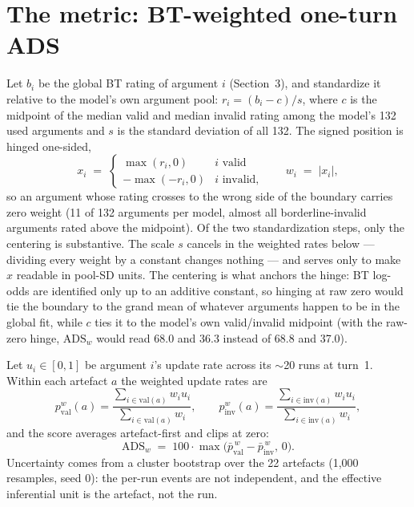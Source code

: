 \documentclass[11pt]{article}
\begin{document}
\section{The metric: BT-weighted one-turn ADS}

Let $b_i$ be the global BT rating of argument $i$ (Section~3), and standardize it relative to the model's own argument pool: $r_i = (b_i - c)/s$, where $c$ is the midpoint of the median valid and median invalid rating among the model's 132 used arguments and $s$ is the standard deviation of all 132. The signed position is hinged one-sided,
\[
x_i \;=\; \begin{cases} \max(r_i, 0) & \text{$i$ valid} \\ -\max(-r_i, 0) & \text{$i$ invalid,} \end{cases}
\qquad w_i \;=\; |x_i|,
\]
so an argument whose rating crosses to the wrong side of the boundary carries zero weight (11 of 132 arguments per model, almost all borderline-invalid arguments rated above the midpoint). Of the two standardization steps, only the centering is substantive. The scale $s$ cancels in the weighted rates below --- dividing every weight by a constant changes nothing --- and serves only to make $x$ readable in pool-SD units. The centering is what anchors the hinge: BT log-odds are identified only up to an additive constant, so hinging at raw zero would tie the boundary to the grand mean of whatever arguments happen to be in the global fit, while $c$ ties it to the model's own valid/invalid midpoint (with the raw-zero hinge, $\mathrm{ADS}_w$ would read 68.0 and 36.3 instead of 68.8 and 37.0).

Let $u_i \in [0,1]$ be argument $i$'s update rate across its $\sim$20 runs at turn~1. Within each artefact $a$ the weighted update rates are
\[
p^{w}_{\mathrm{val}}(a) = \frac{\sum_{i \in \mathrm{val}(a)} w_i u_i}{\sum_{i \in \mathrm{val}(a)} w_i},
\qquad
p^{w}_{\mathrm{inv}}(a) = \frac{\sum_{i \in \mathrm{inv}(a)} w_i u_i}{\sum_{i \in \mathrm{inv}(a)} w_i},
\]
and the score averages artefact-first and clips at zero:
\[
\mathrm{ADS}_w \;=\; 100 \cdot \max\!\big(\bar{p}^{\,w}_{\mathrm{val}} - \bar{p}^{\,w}_{\mathrm{inv}},\, 0\big).
\]
Uncertainty comes from a cluster bootstrap over the 22 artefacts (1{,}000 resamples, seed 0): the per-run events are not independent, and the effective inferential unit is the artefact, not the run.
\end{document}
